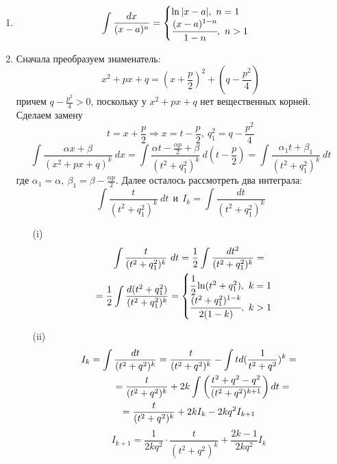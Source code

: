 \begin{enumerate}
    \item \[\int\frac{dx}{(x-a)^n}  = \begin{cases}\ln|x-a|,\ n = 1\\ \cfrac{(x-a)^{1-n}}{1-n}, \ n > 1\end{cases}\]
    \item Сначала преобразуем знаменатель:
    \[x^2+px+q=(x+\frac{p}{2})^2+(q-\frac{p^2}{4})\]
    причем $q-\frac{p^2}{4}>0$, поскольку у $x^2+px+q$ нет вещественных корней. Сделаем замену 
    \[t=x+\frac{p}{2} \Rightarrow x= t-\frac{p}{2},\ q_1^2=q-\frac{p^2}{4}\]
    \[\int\frac{\alpha x+\beta}{(x^2+px+q)^k}\ dx = \int \frac{\alpha t-\frac{\alpha p}{2}+\beta}{(t^2+q_1^2)^k}\ d(t-\frac{p}{2})=\int \frac{\alpha_1 t+\beta_1}{(t^2+q_1^2)^k}\ dt\]
    где $\alpha_1=\alpha,\ \beta_1=\beta-\frac{\alpha p}{2}$. Далее осталось рассмотреть два интеграла:
    \[\int \frac{t}{(t^2+q_1^2)^k}\ dt\ \ \text{и}\ \ I_k=\int \frac{dt}{(t^2+q_1^2)^k}\]
    \begin{itemize}
        \item[(i)] 
        \begin{multline*}
            \int\frac{t}{(t^2+q_1^2)^k}\ dt = \frac{1}{2}\int\frac{dt^2}{(t^2+q_1^2)^k} =\\
            = \frac{1}{2}\int\frac{d(t^2+q_1^2)}{(t^2+q_1^2)^k} = \begin{cases}\cfrac{1}{2}\ln(t^2+q_1^2),\ k = 1\\ \cfrac{(t^2+q_1^2)^{1-k}}{2(1-k)}, \ k > 1\end{cases}
        \end{multline*}
        \item[(ii)] 
        \begin{multline*}
            I_k=\int \frac{dt}{(t^2+q^2)^k}=\frac{t}{(t^2+q^2)^k}-\int t d(\frac{1}{t^2+q^2})^k=\\
            \tab[1cm]=\frac{t}{(t^2+q^2)^k}+2k\int \left(\frac{t^2+q^2-q^2}{(t^2+q^2)^{k+1}}\right)dt=\\
            =\frac{t}{(t^2+q^2)^k}+2kI_k-2kq^2 I_{k+1}
        \end{multline*}
        \[I_{k+1}=\frac{1}{2kq^2}\cdot \frac{t}{(t^2+q^2)^k}+\frac{2k-1}{2kq^2}I_k\]
    \end{itemize}
\end{enumerate}